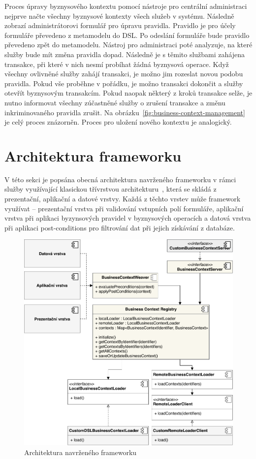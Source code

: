 Proces úpravy byznysového kontextu pomocí nástroje pro centrální administraci nejprve načte všechny
byznysové kontexty všech služeb v systému. Následně zobrazí administrátorovi formulář pro úpravu pravidla.
Pravidlo je pro účely formuláře převedeno z metamodelu do \gls{DSL}. Po odeslání formuláře bude pravidlo
převedeno zpět do metamodelu. Nástroj pro administraci poté analyzuje, na které služby bude
mít změna pravidla dopad. Následně je s těmito službami zahájena transakce, při které v nich
nesmí probíhat žádná byznysová operace. Když všechny ovlivněné služby zahájí transakci, je možno
jim rozeslat novou podobu pravidla. Pokud vše proběhne v pořádku, je možno transakci dokončit
a služby otevřít byznysovým transakcím. Pokud naopak některý z kroků transakce selže, je nutno
informovat všechny zúčastněné služby o zrušení transakce a změnu inkriminovaného pravidla zrušit.
Na obrázku~\ref{fig:business-context-management} je celý proces znázorněn. Proces pro uložení
nového kontextu je analogický.

\section{Architektura frameworku}\label{sec:architecture}

V této sekci je popsána obecná architektura navrženého frameworku v rámci služby využívající
klasickou třívrstvou architekturu~\cite{fowler2002patterns}, která se skládá z prezentační,
aplikační a datové vrstvy. Každá z těchto vrstev může framework využívat
-- prezentační vrstva při validování vstupních polí formuláře, aplikační vrstva při
aplikaci byzynsových pravidel v byznysových operacích a datová vrstva při aplikaci post-conditions pro
filtrování dat při jejich získávání z databáze.

\begin{figure}
    \centering
    \includegraphics[keepaspectratio=true, width=\linewidth]{figures/business-context-registry.pdf}
    \caption{Architektura navrženého frameworku}
    \label{fig:business-context-registry}
\end{figure}

